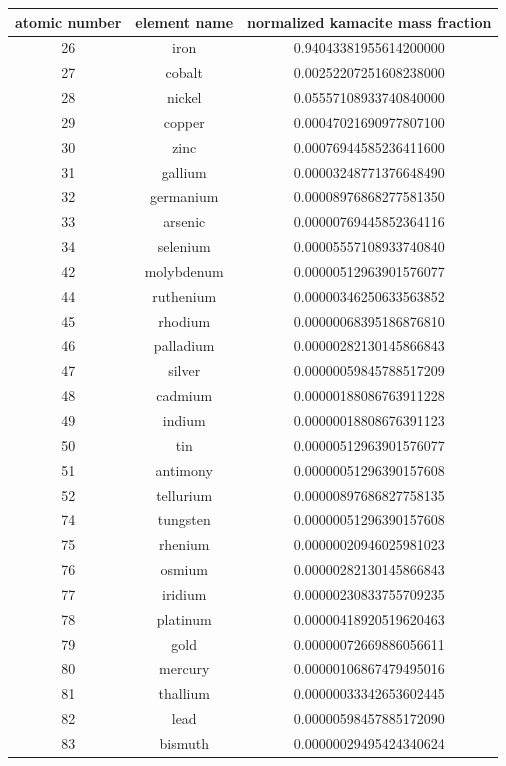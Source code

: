 \documentclass[a4paper]{article}
\begin{document}
	\begin{center}
		\begin{tabular}{|c|c|c|}
			\hline
			atomic number & element name & normalized kamacite mass fraction \\
			\hline
			26 & iron & 0.94043381955614200000 \\
			\hline
			27 & cobalt & 0.00252207251608238000 \\
			\hline
			28 & nickel & 0.05557108933740840000 \\
			\hline
			29 & copper & 0.00047021690977807100 \\
			\hline
			30 & zinc & 0.00076944585236411600 \\
			\hline
			31 & gallium & 0.00003248771376648490 \\
			\hline
			32 & germanium & 0.00008976868277581350 \\
			\hline
			33 & arsenic & 0.00000769445852364116 \\
			\hline
			34 & selenium & 0.00005557108933740840 \\
			\hline
			42 & molybdenum & 0.00000512963901576077 \\
			\hline
			44 & ruthenium & 0.00000346250633563852 \\
			\hline
			45 & rhodium & 0.00000068395186876810 \\
			\hline
			46 & palladium & 0.00000282130145866843 \\
			\hline
			47 & silver & 0.00000059845788517209 \\
			\hline
			48 & cadmium & 0.00000188086763911228 \\
			\hline
			49 & indium & 0.00000018808676391123 \\
			\hline
			50 & tin & 0.00000512963901576077 \\
			\hline
			51 & antimony & 0.00000051296390157608 \\
			\hline
			52 & tellurium & 0.00000897686827758135 \\
			\hline
			74 & tungsten & 0.00000051296390157608 \\
			\hline
			75 & rhenium & 0.00000020946025981023 \\
			\hline
			76 & osmium & 0.00000282130145866843 \\
			\hline
			77 & iridium & 0.00000230833755709235 \\
			\hline
			78 & platinum & 0.00000418920519620463 \\
			\hline
			79 & gold & 0.00000072669886056611 \\
			\hline
			80 & mercury & 0.00000106867479495016 \\
			\hline
			81 & thallium & 0.00000033342653602445 \\
			\hline
			82 & lead & 0.00000598457885172090 \\
			\hline
			83 & bismuth & 0.00000029495424340624 \\
			\hline
		\end{tabular}
	\end{center}
	
\end{document}
